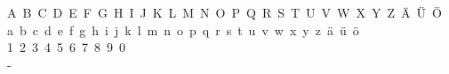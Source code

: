 \documentclass[a4paper,20pt]{article}%
\begin{document}
 \noindent
 A~B~C~D~E~F~G~H~I~J~K~L~M~N~O~P~Q~R~S~T~U~V~W~X~Y~Z~Ä~Ü~Ö\\
 a~b~c~d~e~f~g~h~i~j~k~l~m~n~o~p~q~r~s~t~u~v~w~x~y~z~ä~ü~ö\\
 1~2~3~4~5~6~7~8~9~0\\
 -\\
\end{document}
